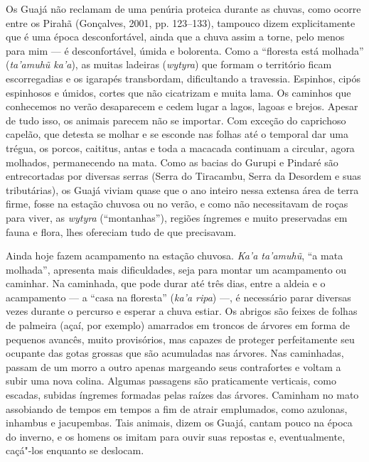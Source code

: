 Os Guajá não reclamam de uma penúria proteica durante as chuvas, como
ocorre entre os Pirahã (Gonçalves, 2001, pp. 123--133), tampouco dizem
explicitamente que é uma época desconfortável, ainda que a chuva assim a
torne, pelo menos para mim --- é desconfortável, úmida e bolorenta. Como a
``floresta está molhada'' (\emph{ta'amuhũ ka'a}), as muitas ladeiras
(\emph{wytyra}) que formam o território ficam escorregadias e os
igarapés transbordam, dificultando a travessia. Espinhos, cipós
espinhosos e úmidos, cortes que não cicatrizam e muita lama. Os caminhos
que conhecemos no verão desaparecem e cedem lugar a lagos, lagoas e
brejos. Apesar de tudo isso, os animais parecem não se importar. 
Com exceção do caprichoso capelão, que detesta se molhar e se
esconde nas folhas até o temporal dar uma trégua, os porcos, caititus,
antas e toda a macacada continuam a circular, agora molhados,
permanecendo na mata. Como as bacias do Gurupi e Pindaré são
entrecortadas por diversas serras (Serra do Tiracambu, Serra da Desordem
e suas tributárias), os Guajá viviam quase que o ano inteiro nessa
extensa área de terra firme, fosse na estação chuvosa ou no verão, e como não necessitavam de roças para
viver, as \emph{wytyra} (``montanhas''), regiões íngremes e muito
preservadas em fauna e flora, lhes ofereciam tudo de que precisavam.

Ainda hoje fazem acampamento na estação chuvosa. \emph{Ka'a ta'amuhũ},
``a mata molhada'', apresenta mais dificuldades, seja para montar um
acampamento ou caminhar. Na caminhada, que pode durar até três dias,
entre a aldeia e o acampamento --- a ``casa na floresta'' (\emph{ka'a
ripa}) ---, é necessário parar diversas vezes durante o percurso e esperar
a chuva estiar. Os abrigos são feixes de folhas de palmeira (açaí, por
exemplo) amarrados em troncos de árvores em forma de pequenos avancês,
muito provisórios, mas capazes de proteger perfeitamente seu ocupante
das gotas grossas que são acumuladas nas árvores. Nas caminhadas, passam
de um morro a outro apenas margeando seus contrafortes e voltam a subir
uma nova colina. Algumas passagens são praticamente verticais, como
escadas, subidas íngremes formadas pelas raízes das árvores. Caminham no
mato assobiando de tempos em tempos a fim de atrair emplumados, como
azulonas, inhambus e jacupembas. Tais animais, dizem os Guajá, cantam
pouco na época do inverno, e os homens os imitam para ouvir suas
repostas e, eventualmente, caçá"-los enquanto se deslocam.

